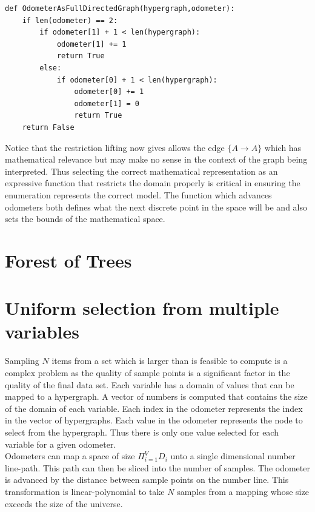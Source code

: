 \documentclass[12pt]{article}
\begin{document}
\begin{lstlisting}
def OdometerAsFullDirectedGraph(hypergraph,odometer):
    if len(odometer) == 2:
        if odometer[1] + 1 < len(hypergraph):
            odometer[1] += 1
            return True
        else:
            if odometer[0] + 1 < len(hypergraph):
                odometer[0] += 1
                odometer[1] = 0
                return True
    return False
\end{lstlisting}

Notice that the restriction lifting now gives allows the edge $\{A \rightarrow A\}$ which has mathematical relevance but may make no sense in the context of the graph being interpreted. Thus selecting the correct mathematical representation as an expressive function that restricts the domain properly is critical in ensuring the enumeration represents the correct model. The function which advances odometers both defines what the next discrete point in the space will be and also sets the bounds of the mathematical space.

\newpage


\section{Forest of Trees}



\newpage

\section{Uniform selection from multiple variables}
Sampling $N$ items from a set which is larger than is feasible to compute is a complex problem as the quality of sample points is a significant factor in the quality of the final data set. Each variable has a domain of values that can be mapped to a hypergraph. A vector of numbers is computed that contains the size of the domain of each variable. Each index in the odometer represents the index in the vector of hypergraphs. Each value in the odometer represents the node to select from the hypergraph. Thus there is only one value selected for each variable for a given odometer. \\

Odometers can map a space of size ${\Pi_{i=1}^{V} D_i}$ unto a single dimensional number line-path. This path can then be sliced into the number of samples. The odometer is advanced by the distance between sample points on the number line. This transformation is linear-polynomial to take $N$ samples from a mapping whose size exceeds the size of the universe. 
\newpage
\end{document}
